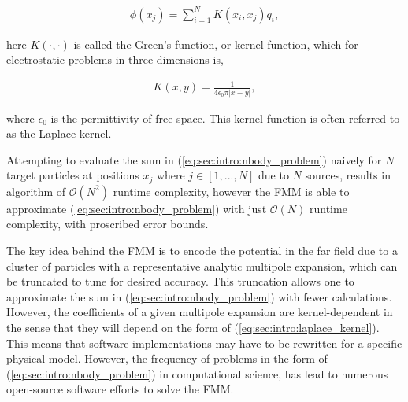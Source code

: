 \documentclass{IEEEcsmag}
\begin{document}
\begin{eqnarray}
	\phi(x_j) = \sum_{i=1}^{N} K(x_i, x_j) q_i,
\label{eq:sec:intro:nbody_problem}
\end{eqnarray}

here $K(\cdot, \cdot)$ is called the Green's function, or kernel function, which for electrostatic problems in three dimensions is,

\begin{eqnarray}
	K(x, y) = \frac{1}{4\epsilon_0\pi|x-y|},
\label{eq:sec:intro:laplace_kernel}
\end{eqnarray}

where $\epsilon_0$ is the permittivity of free space. This kernel function is often referred to as the Laplace kernel.






Attempting to evaluate the sum in (\ref{eq:sec:intro:nbody_problem}) naively for $N$ target particles at positions $x_j$ where $j \in [1,...,N]$ due to $N$ sources, results in algorithm of $\mathcal{O}(N^2)$ runtime complexity, however the FMM is able to approximate (\ref{eq:sec:intro:nbody_problem}) with just $\mathcal{O}(N)$ runtime complexity, with proscribed error bounds.

The key idea behind the FMM is to encode the potential in the far field due to a cluster of particles with a representative analytic multipole expansion, which can be truncated to tune for desired accuracy. This truncation
allows one to approximate the sum in (\ref{eq:sec:intro:nbody_problem}) with fewer calculations. However, the coefficients of a given multipole expansion are kernel-dependent in the sense that they will depend on the form of (\ref{eq:sec:intro:laplace_kernel}). This means that software implementations may have to be rewritten for a specific physical model.  However, the frequency of problems in the form of (\ref{eq:sec:intro:nbody_problem}) in computational science, has lead to numerous open-source software efforts to solve the FMM.
\end{document}
